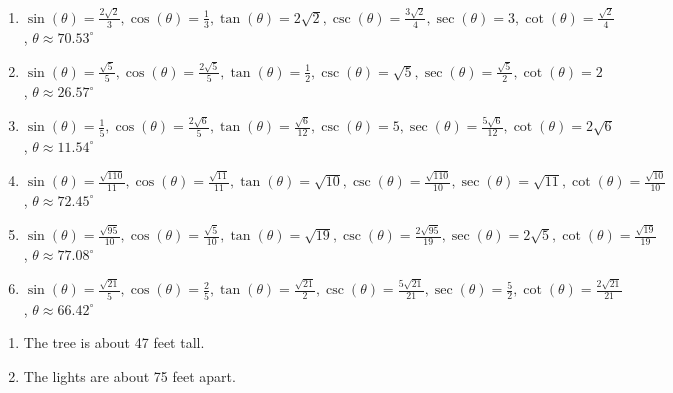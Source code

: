 \documentclass{ximera}
\begin{document}
\begin{enumerate}
\item $\sin(\theta) = \frac{2\sqrt{2}}{3}, \cos(\theta) = \frac{1}{3}, \tan(\theta) = 2\sqrt{2}, \csc(\theta) = \frac{3\sqrt{2}}{4}, \sec(\theta) = 3, \cot(\theta) = \frac{\sqrt{2}}{4}$, $\theta \approx 70.53^{\circ}$

\item $\sin(\theta) = \frac{\sqrt{5}}{5}, \cos(\theta) = \frac{2\sqrt{5}}{5}, \tan(\theta) = \frac{1}{2}, \csc(\theta) = \sqrt{5}, \sec(\theta) = \frac{\sqrt{5}}{2}, \cot(\theta) = 2$, $\theta \approx 26.57^{\circ}$

\item $\sin(\theta) = \frac{1}{5}, \cos(\theta) = \frac{2\sqrt{6}}{5}, \tan(\theta) = \frac{\sqrt{6}}{12}, \csc(\theta) = 5, \sec(\theta) = \frac{5\sqrt{6}}{12}, \cot(\theta) = 2\sqrt{6}$, $\theta \approx 11.54^{\circ}$

\item $\sin(\theta) = \frac{\sqrt{110}}{11}, \cos(\theta) = \frac{\sqrt{11}}{11}, \tan(\theta) = \sqrt{10}, \csc(\theta) = \frac{\sqrt{110}}{10}, \sec(\theta) = \sqrt{11}, \cot(\theta) = \frac{\sqrt{10}}{10}$, $\theta \approx 72.45^{\circ}$

\item $\sin(\theta) = \frac{\sqrt{95}}{10}, \cos(\theta) = \frac{\sqrt{5}}{10}, \tan(\theta) = \sqrt{19}, \csc(\theta) = \frac{2\sqrt{95}}{19}, \sec(\theta) = 2\sqrt{5}, \cot(\theta) = \frac{\sqrt{19}}{19}$, $\theta \approx 77.08^{\circ}$

\item $\sin(\theta) = \frac{\sqrt{21}}{5}, \cos(\theta) = \frac{2}{5}, \tan(\theta) = \frac{\sqrt{21}}{2}, \csc(\theta) = \frac{5\sqrt{21}}{21}, \sec(\theta) = \frac{5}{2}, \cot(\theta) = \frac{2\sqrt{21}}{21}$, $\theta \approx  66.42^{\circ}$

\setcounter{HW}{\value{enumi}}

\end{enumerate}

\begin{enumerate}

\setcounter{enumi}{\value{HW}}

\item The tree is about 47 feet tall.

\item The lights are about 75 feet apart.

\setcounter{HW}{\value{enumi}}

\end{enumerate}
\end{document}
